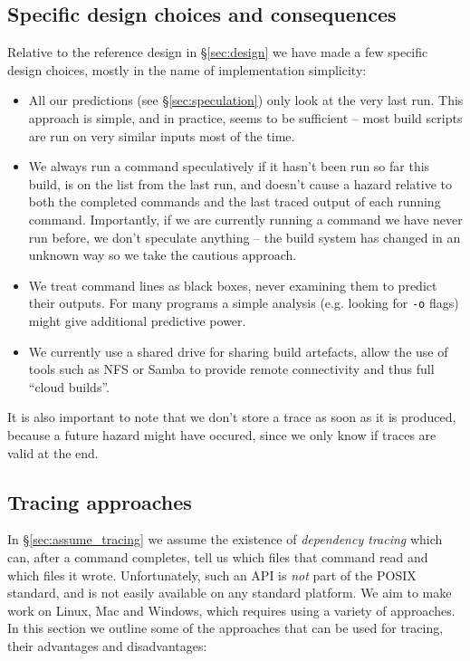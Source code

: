 \subsection{Specific design choices and consequences}
\label{sec:choices}

Relative to the reference design in \S\ref{sec:design} we have made a few specific design choices, mostly in the name of implementation simplicity:

\begin{itemize}
\item All our predictions (see \S\ref{sec:speculation}) only look at the very last run. This approach is simple, and in practice, seems to be sufficient -- most build scripts are run on very similar inputs most of the time.
\item We always run a command speculatively if it hasn't been run so far this build, is on the list from the last run, and doesn't cause a hazard relative to both the completed commands and the last traced output of each running command. Importantly, if we are currently running a command we have never run before, we don't speculate anything -- the build system has changed in an unknown way so we take the cautious approach.
\item We treat command lines as black boxes, never examining them to predict their outputs. For many programs a simple analysis (e.g. looking for \texttt{-o} flags) might give additional predictive power.
\item We currently use a shared drive for sharing build artefacts, allow the use of tools such as NFS or Samba to provide remote connectivity and thus full ``cloud builds''.
\end{itemize}

It is also important to note that we don't store a trace as soon as it is produced, because a future hazard might have occured, since we only know if traces are valid at the end.

\subsection{Tracing approaches}
\label{sec:tracing}

In \S\ref{sec:assume_tracing} we assume the existence of \emph{dependency tracing} which can, after a command completes, tell us which files that command read and which files it wrote. Unfortunately, such an API is \emph{not} part of the POSIX standard, and is not easily available on any standard platform. We aim to make \Rattle work on Linux, Mac and Windows, which requires using a variety of approaches. In this section we outline some of the approaches that can be used for tracing, their advantages and disadvantages:


